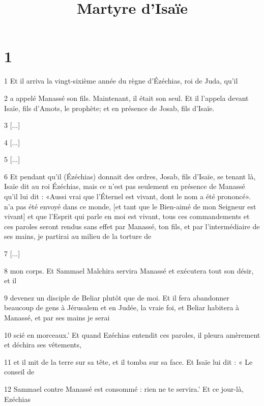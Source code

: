 

\title{Martyre d'Isaïe}

\chapter{1}

\par 1 Et il arriva la vingt-sixième année du règne d'Ézéchias, roi de Juda, qu'il

\par 2 a appelé Manassé son fils. Maintenant, il était son seul. Et il l'appela devant Isaïe, fils d'Amots, le prophète; et en présence de Josab, fils d'Isaïe.

\par 3 [...]

\par 4 [...]

\par 5 [...]

\par 6 Et pendant qu'il (Ézéchias) donnait des ordres, Josab, fils d'Isaïe, se tenant là, Isaïe dit au roi Ézéchias, mais ce n'est pas seulement en présence de Manassé qu'il lui dit : «Aussi vrai que l'Éternel est vivant, dont le nom a été prononcé». n'a pas été envoyé dans ce monde, [et tant que le Bien-aimé de mon Seigneur est vivant] et que l'Esprit qui parle en moi est vivant, tous ces commandements et ces paroles seront rendus sans effet par Manassé, ton fils, et par l'intermédiaire de ses mains, je partirai au milieu de la torture de

\par 7 [...]

\par 8 mon corps. Et Sammael Malchira servira Manassé et exécutera tout son désir, et il

\par 9 devenez un disciple de Beliar plutôt que de moi. Et il fera abandonner beaucoup de gens à Jérusalem et en Judée, la vraie foi, et Beliar habitera à Manassé, et par ses mains je serai

\par 10 scié en morceaux.' Et quand Ezéchias entendit ces paroles, il pleura amèrement et déchira ses vêtements,

\par 11 et il mit de la terre sur sa tête, et il tomba sur sa face. Et Isaïe lui dit : « Le conseil de

\par 12 Sammael contre Manassé est consommé : rien ne te servira.' Et ce jour-là, Ezéchias

